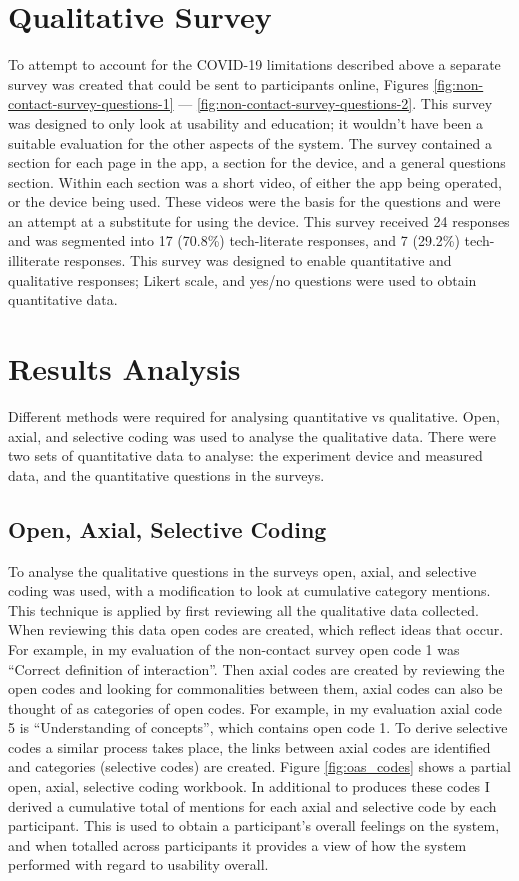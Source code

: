 \documentclass{l4proj}
\begin{document}
\section{Qualitative Survey}

To attempt to account for the COVID-19 limitations described above a separate survey was created that could be sent to participants online, Figures \ref{fig:non-contact-survey-questions-1} — \ref{fig:non-contact-survey-questions-2}. This survey was designed to only look at usability and education; it wouldn't have been a suitable evaluation for the other aspects of the system. The survey contained a section for each page in the app, a section for the device, and a general questions section. Within each section was a short video, of either the app being operated, or the device being used. These videos were the basis for the questions and were an attempt at a substitute for using the device. This survey received 24 responses and was segmented into 17 (70.8\%) tech-literate responses, and 7 (29.2\%) tech-illiterate responses. This survey was designed to enable quantitative and qualitative responses; Likert scale, and yes/no questions were used to obtain quantitative data.

\section{Results Analysis}

Different methods were required for analysing quantitative vs qualitative. Open, axial, and selective coding \citep{williams_artofcoding_2019} was used to analyse the qualitative data. There were two sets of quantitative data to analyse: the experiment device and measured data, and the quantitative questions in the surveys.

\subsection{Open, Axial, Selective Coding}

To analyse the qualitative questions in the surveys open, axial, and selective coding was used, with a modification to look at cumulative category mentions. This technique is applied by first reviewing all the qualitative data collected. When reviewing this data open codes are created, which reflect ideas that occur. For example, in my evaluation of the non-contact survey open code 1 was “Correct definition of interaction”. Then axial codes are created by reviewing the open codes and looking for commonalities between them, axial codes can also be thought of as categories of open codes. For example, in my evaluation axial code 5 is “Understanding of concepts”, which contains open code 1. To derive selective codes a similar process takes place, the links between axial codes are identified and categories (selective codes) are created. Figure \ref{fig:oas_codes} shows a partial open, axial, selective coding workbook. In additional to produces these codes I derived a cumulative total of mentions for each axial and selective code by each participant. This is used to obtain a participant's overall feelings on the system, and when totalled across participants it provides a view of how the system performed with regard to usability overall.
\end{document}
